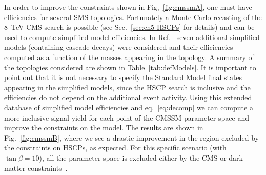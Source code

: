 In order to improve the constraints shown in Fig,~\ref{fig:cmssmA}, one must
have efficiencies for several SMS topologies. Fortunately a Monte Carlo
recasting of the 8~TeV CMS search is possible (see Sec.~\ref{sec:ch5-HSCPs} for details)
and can be used to compute simplified model efficiencies.
In Ref.~\cite{Heisig:2015yla} seven additional simplified models (containing
cascade decays) were considered and their efficiencies computed as a function of
the masses appearing in the topology. A summary of the topologies considered
are shown in Table~\ref{tab:defModels}. It is important to point out that
it is not necessary to specify the Standard Model final states appearing in the
simplified models, since the HSCP search is inclusive and the efficiencies
do not depend on the additional event activity.
Using this extended database of simplified model efficiencies
and eq.~\ref{eq:decomp} we can compute a more inclusive signal yield for each
point of the CMSSM parameter space and improve the constraints on the model.
The results are shown in Fig.~\ref{fig:cmssmB}, where
we see a drastic improvement in the region excluded by
the constraints on HSCPs, as expected.
For this specific scenario (with
$\tan\beta = 10$), all the parameter space is excluded either by the CMS or dark matter
constraints~\cite{Heisig:2015yla}.


